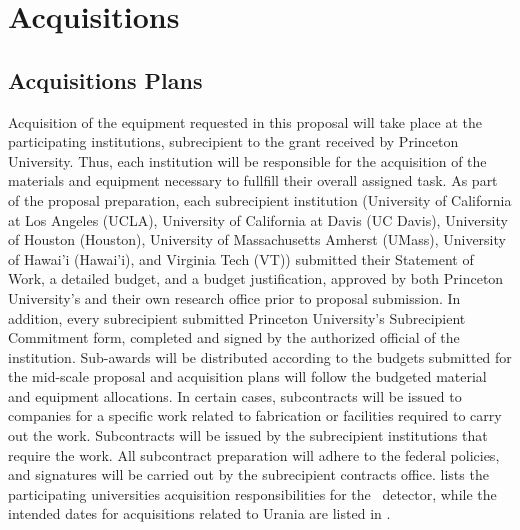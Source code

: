 \section{Acquisitions}
 

\subsection{Acquisitions Plans}

Acquisition of the equipment requested in this proposal will take place at the participating institutions, subrecipient to the grant received by Princeton University. Thus, each institution will be responsible for the acquisition of the materials and equipment necessary to fullfill their overall assigned task.  As part of the proposal preparation, each subrecipient institution (University of California at Los Angeles (UCLA), University of California at Davis (UC Davis), University of Houston (Houston), University of Massachusetts Amherst (UMass), University of Hawai'i (Hawai'i), and Virginia Tech (VT)) submitted their Statement of Work, a detailed budget, and a budget justification, approved by both Princeton University's and their own research office prior to proposal submission.  In addition, every subrecipient submitted Princeton University's Subrecipient Commitment form, completed and signed by the authorized official of the institution.  Sub-awards will be distributed according to the budgets submitted for the mid-scale proposal and acquisition plans will follow the budgeted material and equipment allocations. In certain cases, subcontracts will be issued to companies for a specific work related to fabrication or facilities required to carry out the work.  Subcontracts will be issued by the subrecipient institutions that require the work. All subcontract preparation will adhere to the federal policies, and signatures will be carried out by the subrecipient contracts office.   lists the participating universities acquisition responsibilities for the \DSk\ detector, while the intended dates for acquisitions related to Urania are listed in . 

